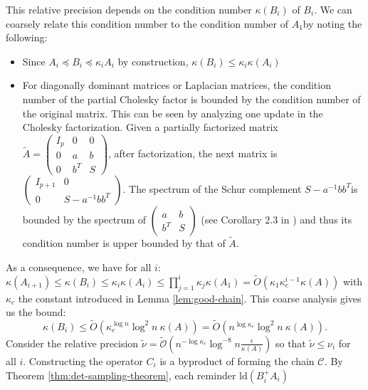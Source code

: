 This relative precision depends on the condition number $\kappa\left(B_{i}\right)$
of $B_{i}$. We can coarsely relate this condition number to the condition
number of $A_{1}$by noting the following: 
\begin{itemize}
\item Since $A_{i}\preceq B_{i}\preceq\kappa_{i}A_{i}$ by construction,
$\kappa\left(B_{i}\right)\leq\kappa_{i}\kappa\left(A_{i}\right)$ 
\item For diagonally dominant matrices or Laplacian matrices, the condition
number of the partial Cholesky factor is bounded by the condition
number of the original matrix. This can be seen by analyzing one update
in the Cholesky factorization. Given a partially factorized matrix
$\tilde{A}=\left(\begin{array}{ccc}
I_{p} & 0 & 0\\
0 & a & b\\
0 & b^{T} & S
\end{array}\right)$, after factorization, the next matrix is $\left(\begin{array}{cc}
I_{p+1} & 0\\
0 & S-a^{-1}bb^{T}
\end{array}\right)$. The spectrum of the Schur complement $S-a^{-1}bb^{T}$is bounded
by the spectrum of $\left(\begin{array}{cc}
a & b\\
b^{T} & S
\end{array}\right)$ (see Corollary 2.3 in \cite{Zhang2005}) and thus its condition number
is upper bounded by that of $\tilde{A}$. 
\end{itemize}
As a consequence, we have for all $i$: $\kappa\left(A_{i+1}\right)\leq\kappa\left(B_{i}\right)\leq\kappa_{i}\kappa\left(A_{i}\right)\leq\prod_{j=1}^{i}\kappa_{j}\kappa\left(A_{1}\right)=\tilde{O}\left(\kappa_{1}\kappa_{c}^{i-1}\kappa\left(A\right)\right)$
with $\kappa_{c}$ the constant introduced in Lemma \ref{lem:good-chain}.
This coarse analysis gives us the bound: 
\[
\kappa\left(B_{i}\right)\leq\tilde{O}\left(\kappa_{c}^{\log n}\log^{2}n~\kappa\left(A\right)\right)=\tilde{O}\left(n^{\log\kappa_{c}}\log^{2}n\ \kappa\left(A\right)\right).
\]
Consider the relative precision $\tilde{\nu}=\tilde{\mathcal{O}}\left(n^{-\log\kappa_{c}}\log^{-8}n\frac{\epsilon}{\kappa\left(A\right)}\right)$
so that $\tilde{\nu}\leq\nu_{i}$ for all $i$. Constructing the operator
$C_{i}$ is a byproduct of forming the chain \emph{$\mathcal{C}$.
}By Theorem \ref{thm:det-sampling-theorem}, each reminder $\text{ld}\left(B_{i}^{+}A_{i}\right)$
